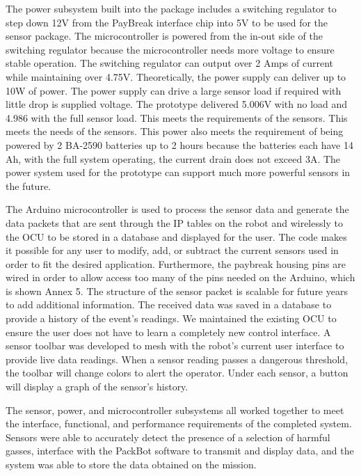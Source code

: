 The power subsystem built into the package includes a switching regulator to step down 12V from the PayBreak interface chip into 5V to be used for the sensor package. The microcontroller is powered from the in-out side of the switching regulator because the microcontroller needs more voltage to ensure stable operation. The switching regulator can output over 2 Amps of current while maintaining over 4.75V. Theoretically, the power supply can deliver up to 10W of power.  The power supply can drive a large sensor load if required with little drop is supplied voltage. The prototype delivered 5.006V with no load and 4.986 with the full sensor load. This meets the requirements of the sensors. This meets the needs of the sensors. This power also meets the requirement of being powered by 2 BA-2590 batteries up to 2 hours because the batteries each have 14 Ah, with the full system operating, the current drain does not exceed 3A.  The power system used for the prototype can support much more powerful sensors in the future.

The Arduino microcontroller is used to process the sensor data and generate the data packets that are sent through the IP tables on the robot and wirelessly to the OCU to be stored in a database and displayed for the user. The code makes it possible for any user to modify, add, or subtract the current sensors used in order to fit the desired application. Furthermore, the paybreak housing pins are wired in order to allow access too many of the pins needed on the Arduino, which is shown Annex 5. The structure of the sensor packet is scalable for future years to add additional information. The received data was saved in a database to provide a history of the event's readings. We maintained the existing OCU to ensure the user does not have to learn a completely new control interface. A sensor toolbar was developed to mesh with the robot's current user interface to provide live data readings. When a sensor reading passes a dangerous threshold, the toolbar will change colors to alert the operator. Under each sensor, a button will display a graph of the sensor's history.

The sensor, power, and microcontroller subsystems all worked together to meet the interface, functional, and performance requirements of the completed system. Sensors were able to accurately detect the presence of a selection of harmful gasses, interface with the PackBot software to transmit and display data, and the system was able to store the data obtained on the mission. 